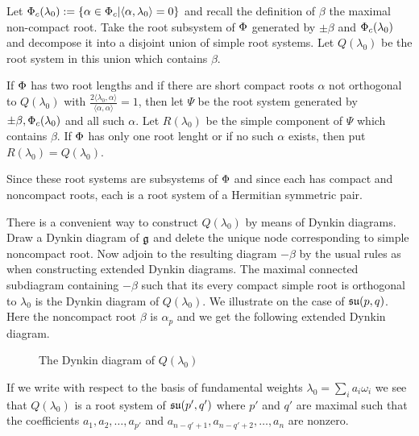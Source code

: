 Let $\Phi_c(\lambda_0) := \{ \alpha \in \Phi_c | \langle \alpha,\lambda_0 \rangle = 0 \}$ and recall the definition of $\beta$ the maximal non-compact root. Take the root subsystem of $\Phi$ generated by $\pm \beta$ and $\Phi_c(\lambda_0)$ and decompose it into a disjoint union of simple root systems. Let $Q(\lambda_0)$ be the root system in this union which contains $\beta$.

If $\Phi$ has two root lengths and if there are short compact roots $\alpha$ not orthogonal to $Q(\lambda_0)$ with $\frac{2 \langle \lambda_0,\alpha \rangle}{\langle \alpha, \alpha \rangle}  =1$, then let $\Psi$ be the root system generated by $\pm \beta, \Phi_c(\lambda_0)$ and all such $\alpha$. Let $R(\lambda_0)$ be the simple component of $\Psi$ which contains $\beta$. If $\Phi$ has only one root lenght or if no such $\alpha$ exists, then put $R(\lambda_0) = Q(\lambda_0)$.

Since these root systems are subsystems of $\Phi$ and since each has compact and noncompact roots, each is a root system of a Hermitian symmetric pair.

There is a convenient way to construct $Q(\lambda_0)$ by means of Dynkin diagrams. Draw a Dynkin diagram of $\mathfrak{g}$ and delete the unique node corresponding to simple noncompact root. Now adjoin to the resulting diagram $-\beta$ by the usual rules as when constructing extended Dynkin diagrams. The maximal connected subdiagram containing $-\beta$ such that its every compact simple root is orthogonal to $\lambda_0$ is the Dynkin diagram of $Q(\lambda_0)$. We illustrate on the case of $\mathfrak{su}(p,q)$. Here the noncompact root $\beta$ is $\alpha_p$ and we get the following extended Dynkin diagram.
\begin{figure}[H]\label{fig:Q}
  \begin{center}
  \end{center}\caption{The Dynkin diagram of $Q(\lambda_0)$} 
\end{figure}
If we write with respect to the basis of fundamental weights $\lambda_0 = \sum_i a_i \omega_i$ we see that $Q(\lambda_0)$ is a root system of $\mathfrak{su}(p',q')$ where $p'$ and $q'$ are maximal such that the coefficients $a_1,a_2,\ldots,a_{p'}$ and $a_{n-q'+1},a_{n-q'+2}, \ldots, a_n$ are nonzero.

